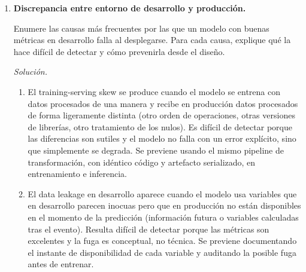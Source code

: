 \documentclass[12pt]{article}
\newcommand\sol[1]{\begin{mdframed}
\emph{Solución.} #1
\end{mdframed}}
\begin{document}
\begin{enumerate}
{\medskip
Igual de importante es la gestión de la incertidumbre y la comunicación: transmitir con precisión qué
puede y qué no puede garantizar el modelo, y traducir esa incertidumbre a términos que los
interesados no técnicos puedan usar para decidir. A esto se suma el conocimiento de los fallos en
producción, pues el experto ha comprobado que un modelo puede funcionar bien en desarrollo y fallar
en producción por causas invisibles durante este (skew entrenamiento-servicio, dependencias de datos,
degradación temporal), y ha interiorizado cómo prevenirlas. También cuenta la intuición sobre los
datos, la capacidad de detectar anomalías o inconsistencias que no se aprecian en las estadísticas
resumen, resultado acumulado de haber trabajado con muchos conjuntos de datos. Por último, la gestión
de los interesados: saber cuándo decir que no, cómo negociar plazos realistas y cómo convertir un
proyecto técnico en un proyecto de negocio con impacto demostrable.
}

\item \textbf{Discrepancia entre entorno de desarrollo y producción.}

Enumere las causas más frecuentes por las que un modelo con buenas métricas en desarrollo falla
al desplegarse. Para cada causa, explique qué la hace difícil de detectar y cómo prevenirla desde
el diseño.

\sol{

\begin{enumerate}[1.]
  \item El training-serving skew se produce cuando el modelo se entrena con datos procesados de una
  manera y recibe en producción datos procesados de forma ligeramente distinta (otro orden de
  operaciones, otras versiones de librerías, otro tratamiento de los nulos). Es difícil de detectar
  porque las diferencias son sutiles y el modelo no falla con un error explícito, sino que
  simplemente se degrada. Se previene usando el mismo pipeline de transformación, con idéntico código
  y artefacto serializado, en entrenamiento e inferencia.

  \item El data leakage en desarrollo aparece cuando el modelo usa variables que en desarrollo
  parecen inocuas pero que en producción no están disponibles en el momento de la predicción
  (información futura o variables calculadas tras el evento). Resulta difícil de detectar porque las
  métricas son excelentes y la fuga es conceptual, no técnica. Se previene documentando el instante de
  disponibilidad de cada variable y auditando la posible fuga antes de entrenar.


\end{enumerate}}
\end{enumerate}
\end{document}
